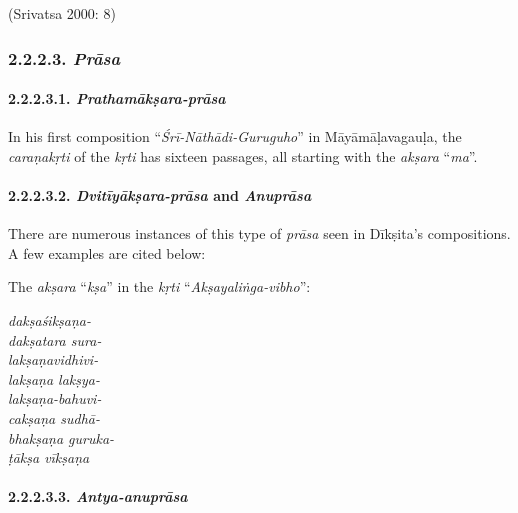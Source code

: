 \begin{flushright}
(Srivatsa 2000: 8)
\end{flushright}

\newpage

\subsubsection*{2.2.2.3. \textit{Prāsa}}

\paragraph*{2.2.2.3.1. \textit{Prathamākṣara-prāsa}}

In his first composition ``\textit{Śrī-Nāthādi-Guruguho}'' in Māyāmāḷavagauḷa, the \textit{caraṇa}\textit{kṛti} of the \textit{kṛti} has sixteen passages, all starting with the \textit{akṣara} ``\textit{ma}''.

\vspace{-.3cm}


\paragraph*{2.2.2.3.2. \textit{Dvitīyākṣara-prāsa} and \textit{Anuprāsa}}

There are numerous instances of this type of \textit{prāsa} seen in Dīkṣita’s compositions. A few examples are cited below:

The \textit{akṣara} “\textit{kṣa}” in the \textit{kṛti} “\textit{Akṣayaliṅga-vibho}”:

\begin{myquote}
\textit{dakṣaśikṣaṇa-}\\ \textit{dakṣatara sura-}\\ \textit{lakṣaṇavidhivi-}\\ \textit{lakṣaṇa lakṣya-}\\ \textit{lakṣaṇa-bahuvi-}\\ \textit{cakṣaṇa sudhā-}\\ \textit{bhakṣaṇa guruka-}\\ \textit{ṭākṣa vīkṣaṇa}
\end{myquote}


\paragraph*{2.2.2.3.3. \textit{Antya-anuprāsa}}

